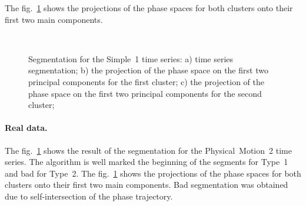 \documentclass[12pt, twoside]{article}
\numberwithin{equation}{section}
\begin{document}
The fig.~\ref{fig_simple_segmentation} shows the projections of the phase spaces for both clusters onto their first two main components.

\begin{figure}[h!t]\center
{}
\\
\caption{Segmentation for the Simple~1 time series: 
a) time series segmentation; b) the projection of the phase space on the first two principal components for the first cluster; c) the projection of the phase space on the first two principal components for the second cluster;}
\label{fig_simple_segmentation}
\end{figure}

\paragraph{Real data.}
The fig.~\ref{fig_simple_segmentation} shows the result of the segmentation for the Physical~Motion~2 time series.
The algorithm is well marked the beginning of the segments for Type~1 and bad for Type~2.
The fig.~\ref{fig_simple_segmentation} shows the projections of the phase spaces for both clusters onto their first two main components.
Bad segmentation was obtained due to self-intersection of the phase trajectory.
\end{document}

